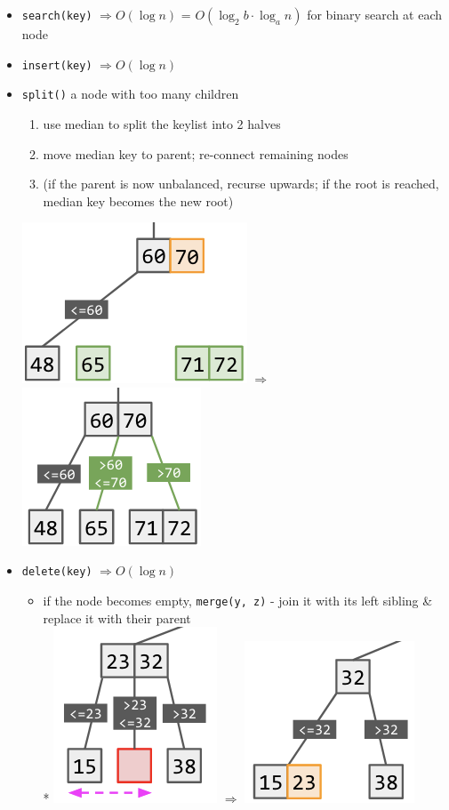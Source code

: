 \documentclass[10pt, landscape]{article}
\let\Then\Rightarrow
\newcommand{\code}[1]{\colorbox{gray!25!}{\lstinline|#1|}}
\begin{document}
\begin{multicols}{4}
\begin{itemize}
    \item \code{search(key)} $\Then O(\log n)$ = $O(\log_2 b \cdot \log_a n)$ for binary search at each node
    \item \code{insert(key)} $\Then O(\log n)$
    \item \code{split()} a node with too many children
    \begin{enumerate}
        \item use median to split the keylist into 2 halves
        \item move median key to parent; re-connect remaining nodes
        \item (if the parent is now unbalanced, recurse upwards; if the root is reached, median key becomes the new root)
    \end{enumerate}
    \includegraphics[width=0.4\linewidth]{cs2040s-abtree-split-1.png}
    $\Then$
    \includegraphics[width=0.3\linewidth]{cs2040s-abtree-split-2.png}
    \item \code{delete(key)} $\Then O(\log n)$
    \begin{itemize}
        \item if the node becomes empty, \code{merge(y, z)} - join it with its left sibling \& replace it with their parent
        \\* \includegraphics[width=0.25\linewidth]{cs2040s-abtree-delete-1.png}
        $\Then$
        \includegraphics[width=0.3\linewidth]{cs2040s-abtree-delete-2.png}

\end{itemize}
\end{itemize}
\end{multicols}
\end{document}
